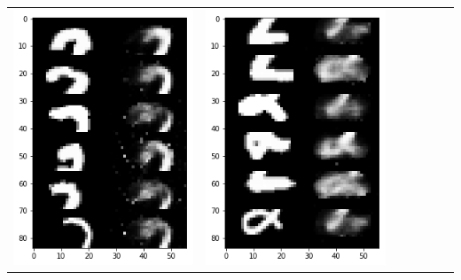 \documentclass[12pt]{report} %
\begin{document}
\begin{tabular}{m{0.7cm}m{2.4cm}m{2.4cm}m{2.4cm}m{2.4cm}m{2.4cm}m{2.4cm}}
\includegraphics[scale=0.3]{pictures/M1_2_up.png} & \includegraphics[scale=0.3]{pictures/M1_2_down.png} &

\end{tabular}
\end{document}
